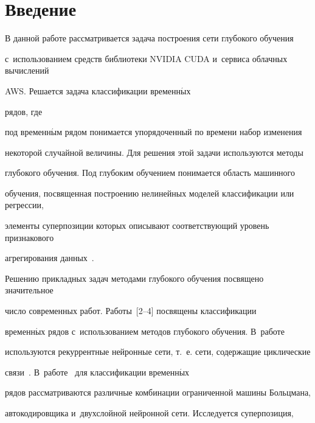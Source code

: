







      \thispagestyle{headings}





\section{Введение}





В данной работе рассматривается задача построения сети глубокого обучения 


с~использованием средств библиотеки NVIDIA CUDA и~сервиса облачных вычислений 


AWS. Решается задача классификации временн$\acute{\mbox{ы}}$х 


рядов, где


под временн$\acute{\mbox{ы}}$м рядом понимается упорядоченный по времени набор изменения 


некоторой случайной величины. Для решения этой задачи используются методы 


глубокого обучения. Под глубоким обучением понимается область машинного 


обучения, посвященная построению нелинейных моделей классификации или регрессии, 


элементы суперпозиции которых описывают соответствующий уровень признакового 


агрегирования данных~\cite{foundamentals}.





Решению прикладных задач методами глубокого обучения посвящено значительное 


число современных работ. Работы~[2--4] посвящены классификации 


временн$\acute{\mbox{ы}}$х рядов с~использованием методов глубокого обучения. В~работе~\cite{ts2} 


используются рекуррентные нейронные сети, т.~е. сети, содержащие циклические 


связи~\cite{foundamentals}. В~работе~\cite{ts3} для классификации временн$\acute{\mbox{ы}}$х 


рядов рассматриваются различные комбинации ограниченной машины Больцмана, 


автокодировщика и~двухслойной нейронной сети. Исследуется суперпозиция, 


